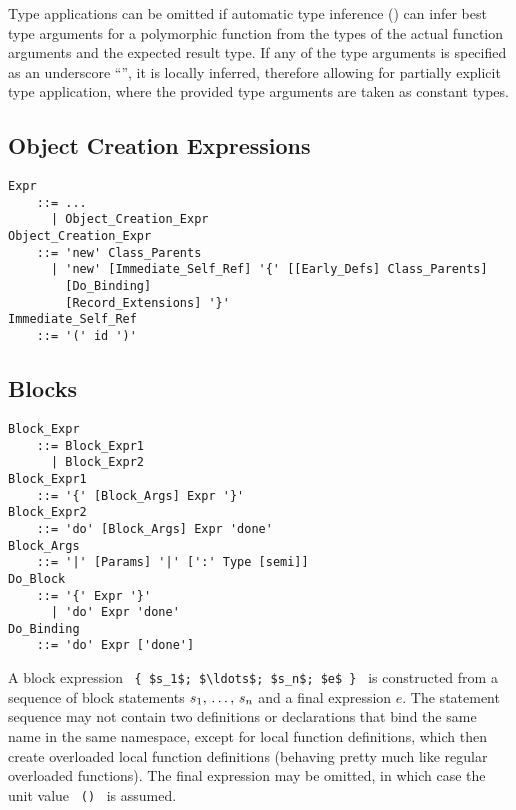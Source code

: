 Type applications can be omitted if automatic type inference () can infer best type arguments for a polymorphic function from the types of the actual function arguments and the expected result type. If any of the type arguments is specified as an underscore ``\code{_}'', it is locally inferred, therefore allowing for partially explicit type application, where the provided type arguments are taken as constant types. 





\subsection{Object Creation Expressions}
\label{sec:object-creation-exprs}

\grammar\begin{lstlisting}
Expr
    ::= ...
      | Object_Creation_Expr
Object_Creation_Expr 
    ::= 'new' Class_Parents 
      | 'new' [Immediate_Self_Ref] '{' [[Early_Defs] Class_Parents]
        [Do_Binding] 
        [Record_Extensions] '}'
Immediate_Self_Ref
    ::= '(' id ')'
\end{lstlisting}





\subsection{Blocks}
\label{sec:blocks}

\grammar\begin{lstlisting}
Block_Expr 
    ::= Block_Expr1 
      | Block_Expr2
Block_Expr1 
    ::= '{' [Block_Args] Expr '}'
Block_Expr2 
    ::= 'do' [Block_Args] Expr 'done'
Block_Args 
    ::= '|' [Params] '|' [':' Type [semi]]
Do_Block 
    ::= '{' Expr '}' 
      | 'do' Expr 'done'
Do_Binding 
    ::= 'do' Expr ['done']
\end{lstlisting}

A block expression ~\lstinline!{ $s_1$; $\ldots$; $s_n$; $e$ }!~ is constructed from a sequence of block statements $s_1 ,\, \ldots ,\, s_n$ and a final expression $e$. The statement sequence may not contain two definitions or declarations that bind the same name in the same namespace, except for local function definitions, which then create overloaded local function definitions (behaving pretty much like regular overloaded functions). The final expression may be omitted, in which case the unit value ~\lstinline!()!~ is assumed. 

